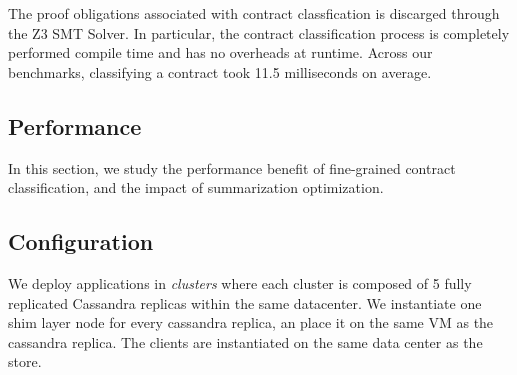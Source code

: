 The proof obligations associated with contract classfication is discarged
through the Z3 SMT Solver. In particular, the contract classification process
is completely performed compile time and has no overheads at runtime. Across
our benchmarks, classifying a contract took 11.5 milliseconds on average.

\subsection{Performance}

In this section, we study the performance benefit of fine-grained contract
classification, and the impact of summarization optimization.

\subsection{Configuration}

We deploy \name applications in \emph{clusters} where each cluster is composed
of 5 fully replicated Cassandra replicas within the same datacenter. We
instantiate one shim layer node for every cassandra replica, an place it on the
same VM as the cassandra replica. The clients are instantiated on the same data
center as the store.

